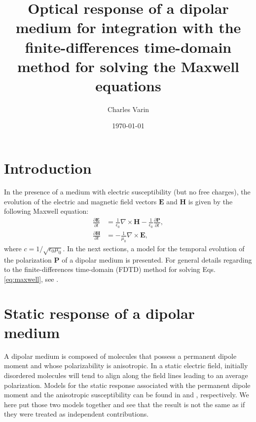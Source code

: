 \documentclass[12pt,letterpaper]{article}
\date{\today}
\author{Charles Varin}
\title{Optical response of a dipolar medium for integration with the finite-differences time-domain method for solving the Maxwell equations}
\begin{document}
\maketitle 
\tableofcontents
\section{Introduction}\label{intro}
In the presence of a medium with electric susceptibility (but no free charges), the evolution of the electric and magnetic field vectors $\mathbf{E}$ and $\mathbf{H}$ is given by the following Maxwell equation:
\begin{subequations}\label{eq:maxwell}
  \begin{align}\label{eq:maxwell1}
   \frac{\partial\mathbf{E}}{\partial t} &=\frac{1}{\epsilon_0}\nabla\times\mathbf{H}-\frac{1}{\epsilon_0}\frac{\partial\mathbf{P}}{\partial t},\\
   \frac{\partial\mathbf{H}}{\partial t} &=-\frac{1}{\mu_0}\nabla\times\mathbf{E},\label{eq:maxwell2}
  \end{align}
\end{subequations}
where $c = 1/\sqrt{\epsilon_0\mu_0}$. In the next sections, a model for the temporal evolution of the polarization $\mathbf{P}$ of a dipolar medium is presented. For general details regarding to the finite-differences time-domain (FDTD) method for solving Eqs. \eqref{eq:maxwell}, see \cite{sullivan2000,taflove2005}.

\section{Static response of a dipolar medium}\label{static}
A dipolar medium is composed of molecules that possess a permanent dipole moment and whose polarizability is anisotropic. In a static electric field, initially disordered molecules will tend to align along the field lines leading to an average polarization. Models for the static response associated with the permanent dipole moment and the anisotropic susceptibility can be found in \cite{jackson1999,hook1991} and \cite{boyd2008}, respectively. We here put those two models together and see that the result is not the same as if they were treated as independent contributions. 
\end{document}
